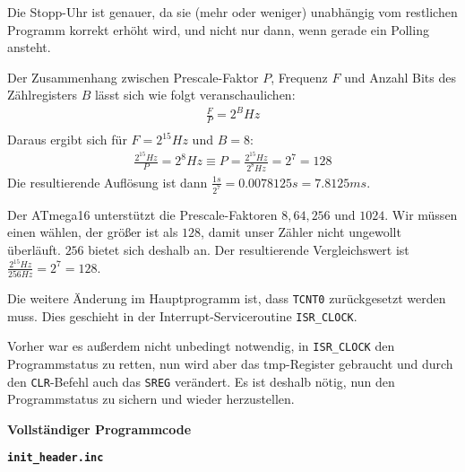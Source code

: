 \documentclass{CInf_practice}
\begin{document}


Die Stopp-Uhr ist genauer, da sie (mehr oder weniger) unabhängig vom 
restlichen Programm korrekt erhöht wird, und nicht nur dann, wenn gerade ein 
Polling ansteht.

Der Zusammenhang zwischen Prescale-Faktor $P$, Frequenz $F$ und Anzahl Bits 
des Zählregisters $B$ lässt sich wie folgt veranschaulichen:
\begin{align*}
\frac{F}{P} = 2^B Hz\\
\end{align*}
Daraus ergibt sich für $F = 2^{15} Hz$ und $B = 8$:
\begin{align*}
\frac{2^{15} Hz}{P} = 2^8 Hz \equiv P = \frac{2^{15} Hz}{2^8 Hz} = 2^7 = 128
\end{align*}
Die resultierende Auflösung ist dann $\frac{1 s}{2^7} = 0.0078125 s = 7.8125 ms$.

Der ATmega16 unterstützt die Prescale-Faktoren $8, 64, 256$ und $1024$. Wir 
müssen einen wählen, der größer ist als $128$, damit unser Zähler nicht 
ungewollt überläuft. $256$ bietet sich deshalb an. Der resultierende 
Vergleichswert ist $\frac{2^{15} Hz}{256 Hz} = 2^7 = 128$.

Die weitere Änderung im Hauptprogramm ist, dass \texttt{TCNT0} zurückgesetzt
werden muss. Dies geschieht in der Interrupt-Serviceroutine \texttt{ISR\_CLOCK}.

Vorher war es außerdem nicht unbedingt notwendig, in \texttt{ISR\_CLOCK} den 
Programmstatus zu retten, nun wird aber das tmp-Register gebraucht und durch
den \texttt{CLR}-Befehl auch das \texttt{SREG} verändert. Es ist deshalb nötig,
nun den Programmstatus zu sichern und wieder herzustellen.




\newpage
{\large\textbf{Vollständiger Programmcode}}


\bigskip

{\large\textbf{\texttt{init\_header.inc}}}

\end{document}
